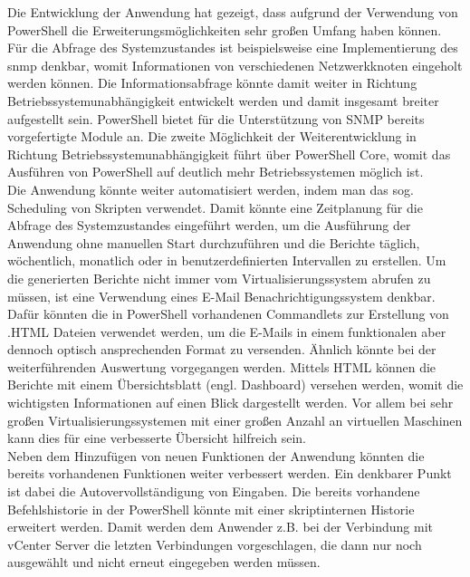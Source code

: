 Die Entwicklung der Anwendung hat gezeigt, dass aufgrund der Verwendung von PowerShell die Erweiterungsmöglichkeiten sehr großen Umfang haben können. Für die Abfrage des Systemzustandes ist beispielsweise eine Implementierung des \acrfull{snmp} denkbar, womit Informationen von verschiedenen Netzwerkknoten eingeholt werden können. Die Informationsabfrage könnte damit weiter in Richtung Betriebssystemunabhängigkeit entwickelt werden und damit insgesamt breiter aufgestellt sein. PowerShell bietet für die Unterstützung von SNMP bereits vorgefertigte Module an. Die zweite Möglichkeit der Weiterentwicklung in Richtung Betriebssystemunabhängigkeit führt über PowerShell Core, womit das Ausführen von PowerShell auf deutlich mehr Betriebssystemen möglich ist.\medskip\\
Die Anwendung könnte weiter automatisiert werden, indem man das sog. Scheduling von Skripten verwendet. Damit könnte eine Zeitplanung für die Abfrage des Systemzustandes eingeführt werden, um die Ausführung der Anwendung ohne manuellen Start durchzuführen und die Berichte täglich, wöchentlich, monatlich oder in benutzerdefinierten Intervallen zu erstellen. Um die generierten Berichte nicht immer vom Virtualisierungssystem abrufen zu müssen, ist eine Verwendung eines E-Mail Benachrichtigungssystem denkbar. Dafür könnten die in PowerShell vorhandenen Commandlets zur Erstellung von .HTML Dateien verwendet werden, um die E-Mails in einem funktionalen aber dennoch optisch ansprechenden Format zu versenden.
Ähnlich könnte bei der weiterführenden Auswertung vorgegangen werden. Mittels HTML können die Berichte mit einem Übersichtsblatt (engl. Dashboard) versehen werden, womit die wichtigsten Informationen auf einen Blick dargestellt werden. Vor allem bei sehr großen Virtualisierungssystemen mit einer großen Anzahl an virtuellen Maschinen kann dies für eine verbesserte Übersicht hilfreich sein.\medskip\\
Neben dem Hinzufügen von neuen Funktionen der Anwendung könnten die bereits vorhandenen Funktionen weiter verbessert werden. Ein denkbarer Punkt ist dabei die Autovervollständigung von Eingaben. Die bereits vorhandene Befehlshistorie in der PowerShell könnte mit einer skriptinternen Historie erweitert werden. Damit werden dem Anwender z.B. bei der Verbindung mit vCenter Server die letzten Verbindungen vorgeschlagen, die dann nur noch ausgewählt und nicht erneut eingegeben werden müssen.\medskip\\ 
